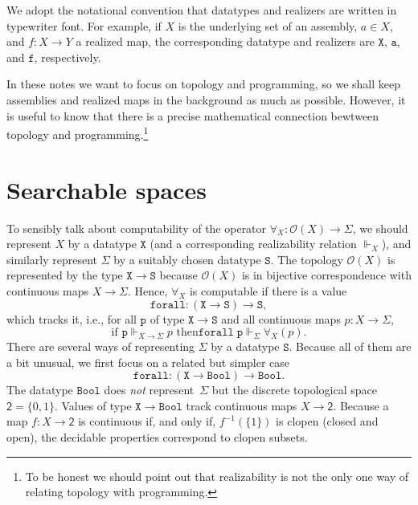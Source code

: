 \documentclass[a4paper,10pt]{article}
\newcommand{\set}[1]{\{#1\}}
\newcommand{\tpl}[1]{\mathcal{O}(#1)}
\newcommand{\two}{\mathsf{2}}
\newcommand{\Bool}{\mathtt{Bool}}
\newcommand{\R}[1]{\mathtt{#1}}
\newcommand{\rz}{\Vdash}
\begin{document}
We adopt the notational convention that datatypes and realizers are written in
typewriter font. For example, if $X$ is the underlying set of an assembly, $a
\in X$, and $f : X \to Y$ a realized map, the corresponding datatype and
realizers are $\mathtt{X}$, $\R{a}$, and $\R{f}$, respectively.

In these notes we want to focus on topology and programming, so we
shall keep assemblies and realized maps in the background as much as
possible. However, it is useful to know that there is a precise
mathematical connection bewtween topology and programming.\footnote{To
  be honest we should point out that realizability is not the only one
  way of relating topology with programming.}


\section{Searchable spaces}
\label{sec:searchable-spaces}

To sensibly talk about computability of the operator $\forall_X : \tpl{X} \to
\Sigma$, we should represent $X$ by a datatype $\mathtt{X}$ (and a
corresponding realizability relation $\rz_X$), and similarly represent
$\Sigma$ by a suitably chosen datatype $\mathtt{S}$. The topology $\tpl{X}$ is
represented by the type $\mathtt{X} \to \mathtt{S}$ because $\tpl{X}$ is in
bijective correspondence with continuous maps $X \to \Sigma$. Hence,
$\forall_X$ is computable if there is a value
% 
\begin{equation*} \R{forall} : (\mathtt{X} \to \mathtt{S}) \to \mathtt{S},
\end{equation*}
% 
which tracks it, i.e., for all $\R{p}$ of type $\mathtt{X} \to \mathtt{S}$ and
all continuous maps $p : X \to \Sigma$,
% 
\begin{equation*} \text{if $\R{p} \rz_{X \to \Sigma} p$ then
$\R{forall}\;\R{p} \rz_\Sigma \forall_X(p)$.}
\end{equation*}
% 
There are several ways of representing $\Sigma$ by a datatype $\mathtt{S}$.
Because all of them are a bit unusual, we first focus on a related but simpler
case
% 
\begin{equation}
  \label{eq:forall-bool} \mathtt{forall} : (\mathtt{X} \to \Bool) \to \Bool.
\end{equation}
% 
The datatype $\Bool$ does \emph{not} represent~$\Sigma$ but the discrete
topological space $\two = \set{0, 1}$. Values of type $\mathtt{X} \to \Bool$
track continuous maps $X \to \two$. Because a map $f : X \to \two$ is
continuous if, and only if, $f^{-1}(\set{1})$ is clopen (closed and open), the
decidable properties correspond to clopen subsets.
\end{document}
